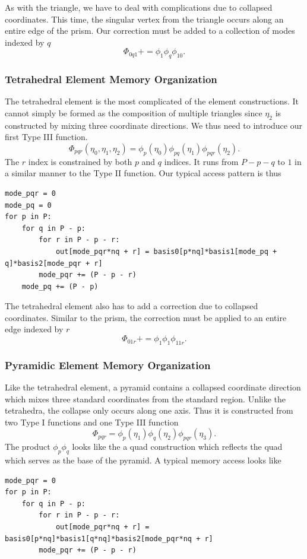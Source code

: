 As with the triangle, we have to deal with complications due to collapsed coordinates. This time, the singular vertex from the triangle occurs along an entire edge of the prism. Our correction must be added to a collection of modes indexed by $q$
\[
    \Phi_{0q1} += \phi_1 \phi_q \phi_{10}.
\]

\subsubsection{Tetrahedral Element Memory Organization}
The tetrahedral element is the most complicated of the element constructions. It cannot simply be formed as the composition of multiple triangles since $\eta_2$ is constructed by mixing three coordinate directions. We thus need to introduce our first Type III function.
\[
    \Phi_{pqr}(\eta_0, \eta_1, \eta_2) = \phi_{p}(\eta_0) \phi_{pq} (\eta_1) \phi_{pqr}(\eta_2).
\]
The $r$ index is constrained by both $p$ and $q$ indices. It runs from $P - p - q$ to $1$ in a similar manner to the Type II function. Our typical access pattern is thus
\begin{lstlisting}
mode_pqr = 0
mode_pq = 0
for p in P:
    for q in P - p:
        for r in P - p - r:
            out[mode_pqr*nq + r] = basis0[p*nq]*basis1[mode_pq + q]*basis2[mode_pqr + r]
        mode_pqr += (P - p - r)
    mode_pq += (P - p)
\end{lstlisting}
The tetrahedral element also has to add a correction due to collapsed coordinates. Similar to the prism, the correction must be applied to an entire edge indexed by $r$
\[
    \Phi_{01r} += \phi_1 \phi_1 \phi_{11r}.
\]

\subsubsection{Pyramidic Element Memory Organization}
Like the tetrahedral element, a pyramid contains a collapsed coordinate direction which mixes three standard coordinates from the standard region. Unlike the tetrahedra, the collapse only occurs along one axis. Thus it is constructed from two Type I functions and one Type III function
\[
    \Phi_{pqr} = \phi_p(\eta_1) \phi_q(\eta_2) \phi_{pqr}(\eta_3).
\]
The product $\phi_p \phi_q$ looks like the a quad construction which reflects the quad which serves as the base of the pyramid. A typical memory access looks like
\begin{lstlisting}
mode_pqr = 0
for p in P:
    for q in P - p:
        for r in P - p - r:
            out[mode_pqr*nq + r] = basis0[p*nq]*basis1[q*nq]*basis2[mode_pqr*nq + r]
        mode_pqr += (P - p - r)
\end{lstlisting}


